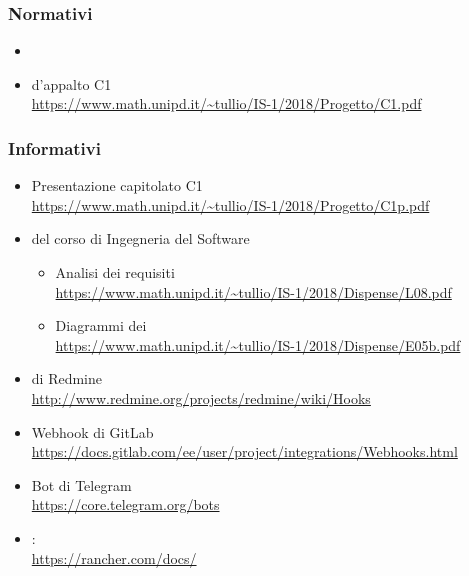 	\subsubsection{Normativi}
	\begin{itemize}
		\item \Doc{\NdPv}
		\item {} d'appalto C1\\
		\url{https://www.math.unipd.it/~tullio/IS-1/2018/Progetto/C1.pdf}
	\end{itemize}

	\subsubsection{Informativi} \label{sec:RiferimentiInformativi}
	\begin{itemize}
		\item Presentazione capitolato C1\\
		\url{https://www.math.unipd.it/~tullio/IS-1/2018/Progetto/C1p.pdf}
		\item {} del corso di Ingegneria del Software
		\begin{itemize}
			\item Analisi dei requisiti\\
			\url{https://www.math.unipd.it/~tullio/IS-1/2018/Dispense/L08.pdf}
			\item Diagrammi dei \\
			\url{https://www.math.unipd.it/~tullio/IS-1/2018/Dispense/E05b.pdf}
		\end{itemize}
		\item {} di Redmine\\
		\url{http://www.redmine.org/projects/redmine/wiki/Hooks}
		\item Webhook di GitLab\\
		\url{https://docs.gitlab.com/ee/user/project/integrations/Webhooks.html}
		\item Bot di Telegram\\
		\url{https://core.telegram.org/bots}
		\item {}: \\\url{https://rancher.com/docs/}
	\end{itemize}